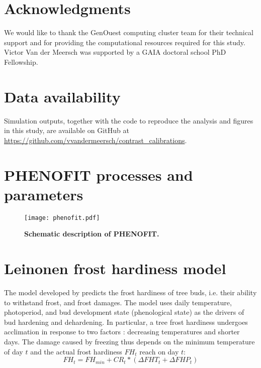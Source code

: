 \documentclass[preprint,12pt,authoryear]{elsarticle}
\begin{document}
{\section*{Acknowledgments}
\noindent We would like to thank the GenOuest computing cluster team for their technical support and for providing the computational resources required for this study. Victor Van der Meersch was supported by a GAIA doctoral school PhD Fellowship.

\section*{Data availability}
\noindent Simulation outputs, together with the code to reproduce the analysis and figures in this study, are available on GitHub at \url{https://github.com/vvandermeersch/contrast_calibrations}.


\clearpage
\appendix

\section{PHENOFIT processes and parameters}
\label{sec:sample:appendix}

\begin{figure}[htpb]
\centering
\texttt{[image: phenofit.pdf]}
\caption{\textbf{Schematic description of PHENOFIT.}}
\end{figure}

\begin{landscape}

\end{landscape}
\restoregeometry

\newpage

\section{Leinonen frost hardiness model}

The model developed by \cite{Leinonen1996} predicts the frost hardiness of tree buds, i.e. their ability to withstand frost, and frost damages. The model uses daily temperature, photoperiod, and bud development state (phenological state) as the drivers of bud hardening and dehardening. In particular, a tree frost hardiness undergoes acclimation in response to two factors : decreasing temperatures and shorter days. The damage caused by freezing thus depends on the minimum temperature of day $t$ and the actual frost hardiness $FH_t$ reach on day $t$:
\begin{equation}
FH_t = FH_{min} + CR_t * (\Delta FHT_t + \Delta FHP_t)
\end{equation}

}
\end{document}
